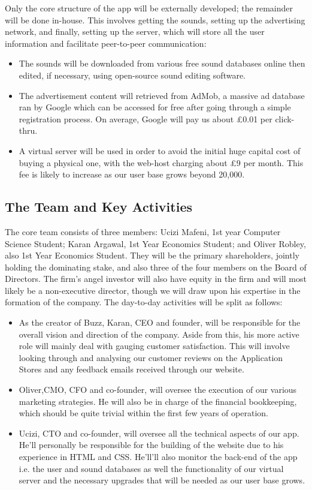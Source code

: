 \documentclass[12pt]{article}
\begin{document}
Only the core structure of the app will be externally developed; the remainder will be done in-house. This involves getting the sounds, setting up the advertising network, and finally, setting up the server, which will store all the user information and facilitate peer-to-peer communication:

\begin{itemize}
    \item The sounds will be downloaded from various free sound databases online then edited, if necessary, using open-source sound editing software.
    \item The advertisement content will retrieved from AdMob, a massive ad database ran by Google which can be accessed for free after going through a simple registration process. On average, Google will pay us about £0.01 per click-thru.
    \item  A virtual server will be used in order to avoid the initial huge capital cost of buying a physical one, with the web-host charging about £9 per month. This fee is likely to increase as our user base grows beyond 20,000.
\end{itemize}


\subsection{The Team and Key Activities}

The core team consists of three members: Ucizi Mafeni, 1st year Computer Science Student; Karan Argawal, 1st Year Economics Student; and Oliver Robley, also 1st Year Economics Student. They will be the primary shareholders, jointly holding the dominating stake, and also three of the four members on the Board of Directors. The firm's angel investor will also have equity in the firm and will most likely be a non-executive director, though we will draw upon his expertise in the formation of the company.
The day-to-day activities will be split as follows:
\begin{itemize}
    \item As the creator of Buzz, Karan, CEO and founder, will be responsible for the overall vision and direction of the company. Aside from this, his more active role will mainly deal with gauging customer satisfaction. This will involve looking through and analysing our customer reviews on the Application Stores and any feedback emails received through our website.
    \item Oliver,CMO, CFO and co-founder, will oversee the execution of our various marketing strategies. He will also be in charge of the financial bookkeeping, which should be quite trivial within the first few years of operation.
    \item Ucizi, CTO and co-founder, will oversee all the technical aspects of our app. He'll personally be responsible for the building of the website due to his experience in HTML and CSS. He'll'll also monitor the back-end of the app i.e. the user and sound databases as well the functionality of our virtual server and the necessary upgrades that will be needed as our user base grows.
\end{itemize}
\end{document}
